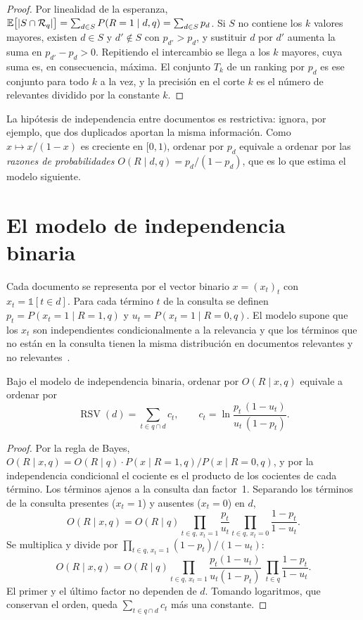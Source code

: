 \begin{proof}
Por linealidad de la esperanza, $\mathbb{E}\bigl[\lvert S\cap\mathcal{R}_q\rvert\bigr]=\sum_{d\in S}P(R=1\mid d,q)=\sum_{d\in S}p_d$. Si $S$ no contiene los $k$ valores mayores, existen $d\in S$ y $d'\notin S$ con $p_{d'}>p_d$, y sustituir $d$ por $d'$ aumenta la suma en $p_{d'}-p_d>0$. Repitiendo el intercambio se llega a los $k$ mayores, cuya suma es, en consecuencia, máxima. El conjunto $T_k$ de un ranking por $p_d$ es ese conjunto para todo $k$ a la vez, y la precisión en el corte $k$ es el número de relevantes dividido por la constante $k$.
\end{proof}

La hipótesis de independencia entre documentos es restrictiva: ignora, por ejemplo, que dos duplicados aportan la misma información. Como $x\mapsto x/(1-x)$ es creciente en $[0,1)$, ordenar por $p_d$ equivale a ordenar por las \emph{razones de probabilidades} $O(R\mid d,q)=p_d/(1-p_d)$, que es lo que estima el modelo siguiente.

\section{El modelo de independencia binaria}

\begin{definicion}\label{def:bim}
Cada documento se representa por el vector binario $x=(x_t)_t$ con $x_t=\mathbb{1}[t\in d]$. Para cada término $t$ de la consulta se definen $p_t=P(x_t=1\mid R=1,q)$ y $u_t=P(x_t=1\mid R=0,q)$. El modelo supone que los $x_t$ son independientes condicionalmente a la relevancia y que los términos que no están en la consulta tienen la misma distribución en documentos relevantes y no relevantes~\cite[§11.3]{iir}.
\end{definicion}

\begin{proposicion}\label{prop:rsv}
Bajo el modelo de independencia binaria, ordenar por $O(R\mid x,q)$ equivale a ordenar por
\[
\operatorname{RSV}(d)=\sum_{t\in q\cap d}c_t,\qquad c_t=\ln\frac{p_t\,(1-u_t)}{u_t\,(1-p_t)} .
\]
\end{proposicion}

\begin{proof}
Por la regla de Bayes, $O(R\mid x,q)=O(R\mid q)\cdot P(x\mid R=1,q)/P(x\mid R=0,q)$, y por la independencia condicional el cociente es el producto de los cocientes de cada término. Los términos ajenos a la consulta dan factor~1. Separando los términos de la consulta presentes ($x_t=1$) y ausentes ($x_t=0$) en $d$,
\[
O(R\mid x,q)=O(R\mid q)\prod_{t\in q,\,x_t=1}\frac{p_t}{u_t}\prod_{t\in q,\,x_t=0}\frac{1-p_t}{1-u_t}.
\]
Se multiplica y divide por $\prod_{t\in q,\,x_t=1}(1-p_t)/(1-u_t)$:
\[
O(R\mid x,q)=O(R\mid q)\prod_{t\in q,\,x_t=1}\frac{p_t(1-u_t)}{u_t(1-p_t)}\;\prod_{t\in q}\frac{1-p_t}{1-u_t}.
\]
El primer y el último factor no dependen de $d$. Tomando logaritmos, que conservan el orden, queda $\sum_{t\in q\cap d}c_t$ más una constante.
\end{proof}

